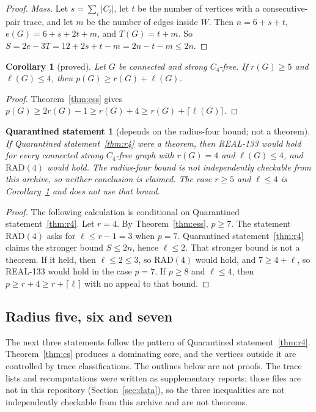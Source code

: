 \documentclass[11pt]{amsart}
\newtheorem{corollary}[theorem]{Corollary}
\newtheorem{qrecord}[theorem]{Quarantined statement}
\theoremstyle{definition}
\theoremstyle{remark}
\newcommand{\lr}{\ell}
\newcommand{\pp}{p}
\newcommand{\RAD}{\mathrm{RAD}}
\begin{document}
\begin{proof}
\emph{Mass.} Let $s=\sum_i|C_i|$, let $t$ be the number of vertices with a consecutive-pair trace, and let $m$ be the number of edges inside $W$. Then $n=6+s+t$, $e(G)=6+s+2t+m$, and $T(G)=t+m$. So $S=2e-3T=12+2s+t-m=2n-t-m\le2n$.
\end{proof}


\begin{corollary}[proved]\label{cor:rge5}
Let $G$ be connected and strong $C_4$-free. If $r(G)\ge 5$ and $\lr(G)\le 4$, then $\pp(G)\ge r(G)+\lr(G)$.
\end{corollary}

\begin{proof}
Theorem~\ref{thm:ess} gives $\pp(G)\ge 2r(G)-1\ge r(G)+4\ge r(G)+\lceil\lr(G)\rceil$.
\end{proof}

\begin{qrecord}[depends on the radius-four bound; not a theorem]\label{cor:r4}
If Quarantined statement~\ref{thm:r4} were a theorem, then REAL-133 would hold for every connected strong $C_4$-free graph with $r(G)=4$ and $\lr(G)\le 4$, and $\RAD(4)$ would hold. The radius-four bound is not independently checkable from this archive, so neither conclusion is claimed. The case $r\ge 5$ and $\lr\le 4$ is Corollary~\ref{cor:rge5} and does not use that bound.
\end{qrecord}

\begin{proof}
The following calculation is conditional on Quarantined statement~\ref{thm:r4}. Let $r=4$. By Theorem~\ref{thm:ess}, $\pp\ge7$. The statement $\RAD(4)$ asks for $\lr\le r-1=3$ when $\pp=7$. Quarantined statement~\ref{thm:r4} claims the stronger bound $S\le2n$, hence $\lr\le2$. That stronger bound is not a theorem. If it held, then $\lr\le2\le3$, so $\RAD(4)$ would hold, and $7\ge4+\lr$, so REAL-133 would hold in the case $\pp=7$. If $\pp\ge8$ and $\lr\le4$, then $\pp\ge r+4\ge r+\lceil\lr\rceil$ with no appeal to that bound.
\end{proof}

\subsection{Radius five, six and seven}
The next three statements follow the pattern of Quarantined statement~\ref{thm:r4}. Theorem~\ref{thm:cs} produces a dominating core, and the vertices outside it are controlled by trace classifications. The outlines below are not proofs. The trace lists and recomputations were written as supplementary reports; those files are not in this repository (Section~\ref{sec:data}), so the three inequalities are not independently checkable from this archive and are not theorems.
\end{document}
